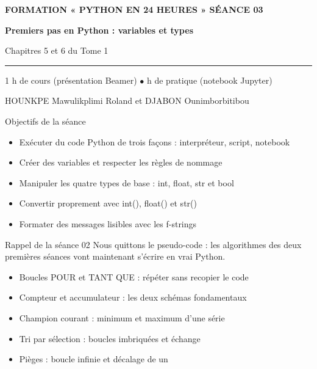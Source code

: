 \documentclass[aspectratio=169,11pt]{beamer}
\begin{document}
{%
\begin{frame}[plain]
\vspace{10mm}
{\color{PyJaune}\small\bfseries FORMATION « PYTHON EN 24 HEURES » \quad\textbar\quad SÉANCE 03\par}
\vspace{4mm}
{\color{white}\Huge\bfseries Premiers pas en Python : variables et types\par}
\vspace{4mm}
{\color{PyBleuClair}\large Chapitres 5 et 6 du Tome 1\par}
\vspace{7mm}
{\color{PyJaune}\rule{34mm}{2.2pt}\par}
\vspace{7mm}
{\color{white}\normalsize 1 h de cours (présentation Beamer) \quad$\bullet$ h de pratique (notebook Jupyter)\par}
\vspace{2.5mm}
{\color{PyBleuClair}\normalsize HOUNKPE Mawulikplimi Roland et DJABON Ounimborbitibou\par}
\end{frame}
}
\begin{frame}{Objectifs de la séance}
\begin{itemize}
  \item Exécuter du code Python de trois façons : interpréteur, script, notebook
  \item Créer des variables et respecter les règles de nommage
  \item Manipuler les quatre types de base : int, float, str et bool
  \item Convertir proprement avec int(), float() et str()
  \item Formater des messages lisibles avec les f-strings
\end{itemize}
\end{frame}
\begin{frame}{Rappel de la séance 02}
Nous quittons le pseudo-code : les algorithmes des deux premières séances vont maintenant s'écrire en vrai Python.

\begin{itemize}
  \item Boucles POUR et TANT QUE : répéter sans recopier le code
  \item Compteur et accumulateur : les deux schémas fondamentaux
  \item Champion courant : minimum et maximum d'une série
  \item Tri par sélection : boucles imbriquées et échange
  \item Pièges : boucle infinie et décalage de un
\end{itemize}
\end{frame}
\end{document}
